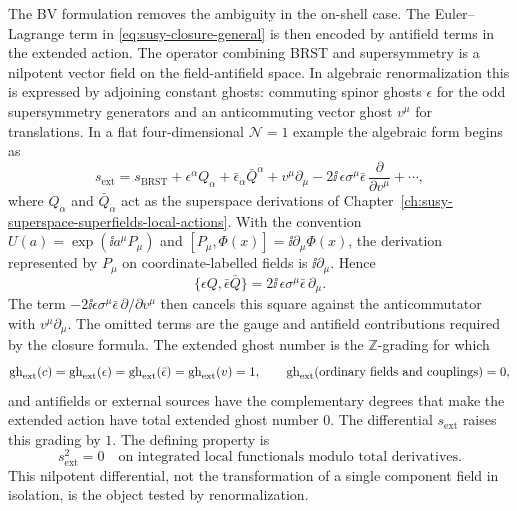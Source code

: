 The BV formulation removes the ambiguity in the on-shell case.  The
Euler--Lagrange term in \eqref{eq:susy-closure-general} is then encoded by
antifield terms in the extended action.  The operator combining BRST and
supersymmetry is a nilpotent vector field on the field-antifield space.  In
algebraic renormalization this is expressed by adjoining constant ghosts:
commuting spinor ghosts \(\epsilon\) for the odd supersymmetry generators and
an anticommuting vector ghost \(v^\mu\) for translations.  In a flat
four-dimensional \(\mathcal N=1\) example the algebraic form begins as
\begin{equation}
  s_{\mathrm{ext}}
  =
  s_{\mathrm{BRST}}
  +\epsilon^\alpha Q_\alpha
  +\bar\epsilon_{\dot\alpha}\bar Q^{\dot\alpha}
  +v^\mu\partial_\mu
  -2\ii\,\epsilon\sigma^\mu\bar\epsilon\,
    \frac{\partial}{\partial v^\mu}
  +\cdots ,
  \label{eq:extended-susy-brst-differential}
\end{equation}
where \(Q_\alpha\) and \(\bar Q_{\dot\alpha}\) act as the superspace
derivations of Chapter~\ref{ch:susy-superspace-superfields-local-actions}.
With the convention \(U(a)=\exp(\ii a^\mu P_\mu)\) and
\([P_\mu,\Phi(x)]=\ii\partial_\mu\Phi(x)\), the derivation represented by
\(P_\mu\) on coordinate-labelled fields is \(\ii\partial_\mu\).  Hence
\[
  \{\epsilon Q,\bar\epsilon\bar Q\}
  =
  2\ii\,\epsilon\sigma^\mu\bar\epsilon\,\partial_\mu .
\]
The term
\(-2\ii\epsilon\sigma^\mu\bar\epsilon\,\partial/\partial v^\mu\) then cancels
this square against the anticommutator with \(v^\mu\partial_\mu\).  The
omitted terms are the gauge and antifield contributions required by the
closure formula.  The extended ghost number is the \(\mathbb Z\)-grading for
which
\[
  \operatorname{gh}_{\rm ext}(c)=
  \operatorname{gh}_{\rm ext}(\epsilon)=
  \operatorname{gh}_{\rm ext}(\bar\epsilon)=
  \operatorname{gh}_{\rm ext}(v)=1,
  \qquad
  \operatorname{gh}_{\rm ext}(\hbox{ordinary fields and couplings})=0,
\]
and antifields or external sources have the complementary degrees that make
the extended action have total extended ghost number \(0\).  The differential
\(s_{\mathrm{ext}}\) raises this grading by \(1\).  The defining property is
\[
  s_{\mathrm{ext}}^2=0
  \quad\text{on integrated local functionals modulo total derivatives.}
\]
This nilpotent differential, not the transformation of a single component
field in isolation, is the object tested by renormalization.

